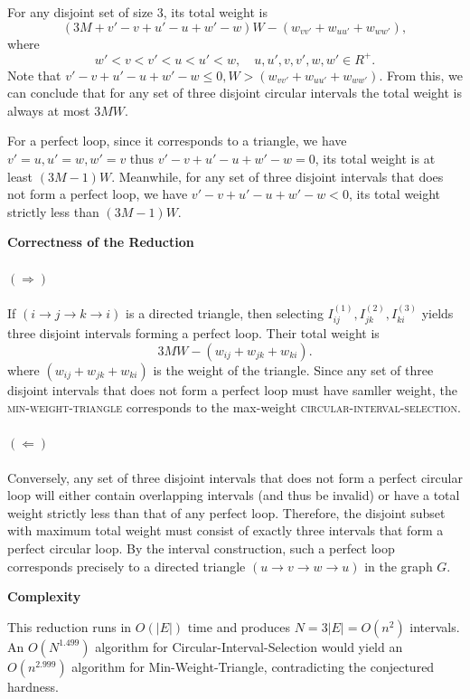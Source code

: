 \documentclass[11pt]{article}
\begin{document}
For any disjoint set of size 3, its total weight is
\[
  (3M + v' - v + u' - u + w' - w)W - (w_{vv'} + w_{uu'} + w_{ww'}),
\]
where
\[
  w' < v < v' < u < u' < w, \quad u, u', v, v', w, w' \in R^+.
\]
Note that $v' - v + u' - u + w' - w \le 0, W > (w_{vv'} + w_{uu'} + w_{ww'})$. From this, we can conclude that for any set of three disjoint circular intervals the total weight is always at most \(3MW\). 

For a perfect loop, since it corresponds to a triangle, we have $v'=u, u'=w, w'=v$ thus $v' - v + u' - u + w' - w =0$, its total weight is at least \((3M-1)W\). 
Meanwhile, for any set of three disjoint intervals that does not form a perfect loop, we have $v' - v + u' - u + w' - w < 0$, its total weight strictly less than \((3M-1)W\).

\textbf{Correctness of the Reduction}

\paragraph{$(\Rightarrow)$}
If $(i \to j \to k \to i)$ is a directed triangle, then selecting $I_{ij}^{(1)},I_{jk}^{(2)},I_{ki}^{(3)}$ yields three disjoint intervals forming a perfect loop. Their total weight is
\[
  3MW - (w_{ij} + w_{jk} + w_{ki}).
\]
where $(w_{ij} + w_{jk} + w_{ki})$ is the weight of the triangle. Since any set of three disjoint intervals that does not form a perfect loop must have samller weight, the \textsc{min-weight-triangle} corresponds to the max-weight \textsc{circular-interval-selection}.

\paragraph{$(\Leftarrow)$}
Conversely, any set of three disjoint intervals that does not form a perfect circular loop will either contain overlapping intervals (and thus be invalid) or have a total weight strictly less than that of any perfect loop. Therefore, the disjoint subset with maximum total weight must consist of exactly three intervals that form a perfect circular loop. By the interval construction, such a perfect loop corresponds precisely to a directed triangle \((u \to v \to w \to u)\) in the graph \(G\).

\textbf{Complexity}

This reduction runs in $O(|E|)$ time and produces $N=3|E|=O(n^2)$ intervals.  An $O(N^{1.499})$ algorithm for {\sc Circular-Interval-Selection} would yield an $O(n^{2.999})$ algorithm for {\sc Min-Weight-Triangle}, contradicting the conjectured hardness.
\end{document}
